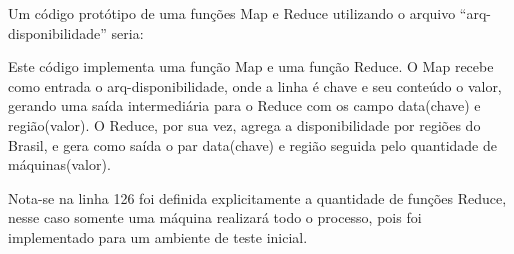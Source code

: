 Um código protótipo de uma funções Map e Reduce utilizando o arquivo
“arq-disponibilidade” seria:



Este código implementa uma função Map e uma função Reduce. O Map recebe como entrada
o arq-disponibilidade, onde a linha é chave e seu conteúdo o valor, gerando uma saída
intermediária para o Reduce com os campo data(chave) e região(valor). O Reduce,
por sua vez, agrega a disponibilidade por regiões do Brasil, e gera como saída
o par data(chave) e região seguida pelo quantidade de máquinas(valor).

Nota-se na linha 126 foi definida explicitamente a quantidade de funções Reduce, nesse caso
somente uma máquina realizará todo o processo, pois foi implementado para um ambiente
de teste inicial.